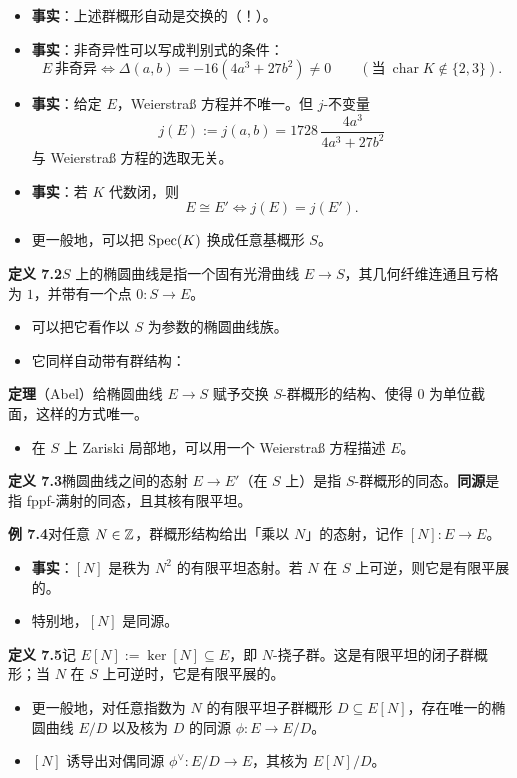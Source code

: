 \begin{itemize}
\item \textbf{事实}：上述群概形自动是交换的（！）。
\item \textbf{事实}：非奇异性可以写成判别式的条件：
\[
E\ \text{非奇异}\iff\Delta(a,b)=-16(4a^3+27b^2)\ne0\qquad(\text{当}\ \operatorname{char}K\notin\{2,3\}).
\]
\item \textbf{事实}：给定 $E$，Weierstraß 方程并不唯一。但 $j$-不变量
\[
j(E):=j(a,b)=1728\,\frac{4a^3}{4a^3+27b^2}
\]
与 Weierstraß 方程的选取无关。
\item \textbf{事实}：若 $K$ 代数闭，则
\[
E\cong E'\iff j(E)=j(E').
\]
\item 更一般地，可以把 $\operatorname{Spec}(K)$ 换成任意基概形 $S$。
\end{itemize}

\noindent\textbf{定义 7.2}\label{def:7.2}\quad $S$ 上的椭圆曲线是指一个固有光滑曲线 $E\to S$，其几何纤维连通且亏格为 $1$，并带有一个点 $0\colon S\to E$。

\begin{itemize}
\item 可以把它看作以 $S$ 为参数的椭圆曲线族。
\item 它同样自动带有群结构：
\end{itemize}

\noindent\textbf{定理}（Abel）\quad 给椭圆曲线 $E\to S$ 赋予交换 $S$-群概形的结构、使得 $0$ 为单位截面，这样的方式唯一。

\begin{itemize}
\item 在 $S$ 上 Zariski 局部地，可以用一个 Weierstraß 方程描述 $E$。
\end{itemize}

\noindent\textbf{定义 7.3}\label{def:7.3}\quad 椭圆曲线之间的态射 $E\to E'$（在 $S$ 上）是指 $S$-群概形的同态。\textbf{同源}是指 fppf-满射的同态，且其核有限平坦。

\noindent\textbf{例 7.4}\label{ex:7.4}\quad 对任意 $N\in\mathbb{Z}$，群概形结构给出「乘以 $N$」的态射，记作 $[N]\colon E\to E$。
\begin{itemize}
\item \textbf{事实}：$[N]$ 是秩为 $N^2$ 的有限平坦态射。若 $N$ 在 $S$ 上可逆，则它是有限平展的。
\item 特别地，$[N]$ 是同源。
\end{itemize}

\noindent\textbf{定义 7.5}\label{def:7.5}\quad 记 $E[N]:=\ker[N]\subseteq E$，即 $N$-挠子群。这是有限平坦的闭子群概形；当 $N$ 在 $S$ 上可逆时，它是有限平展的。
\begin{itemize}
\item 更一般地，对任意指数为 $N$ 的有限平坦子群概形 $D\subseteq E[N]$，存在唯一的椭圆曲线 $E/D$ 以及核为 $D$ 的同源 $\phi\colon E\to E/D$。
\item $[N]$ 诱导出对偶同源 $\phi^\vee\colon E/D\to E$，其核为 $E[N]/D$。
\end{itemize}

